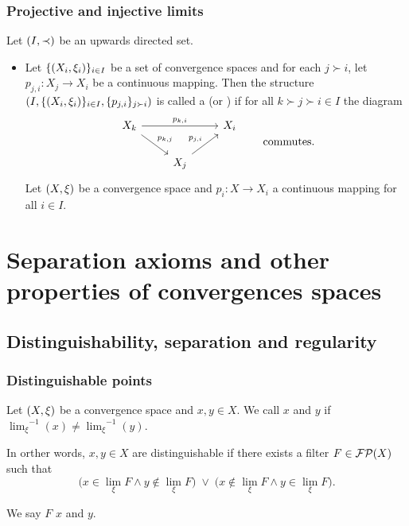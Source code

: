 \subsection{Projective and injective limits}
\begin{definition}
Let $\left( I, \prec \right)$ be an upwards directed set.
\begin{itemize}
\item Let $\{\left( X_i, \xi_i \right)\}_{i\in I}$ be a set of convergence spaces and for each $j \succ i$, let $p_{j,i}: X_j \to X_i$ be a continuous mapping. Then the structure $\left( I, \{\left( X_i, \xi_i \right)\}_{i\in I}, \{p_{j,i}\}_{j\succ i} \right)$ is called a  (or ) if for all $k \succ j \succ i \in I$ the diagram
\[ \begin{tikzcd}
X_k \ar[rr, "p_{k,i}"] \ar[rd, "p_{k,j}"] & & X_i \\
& X_j \ar[ur, "p_{j,i}"]
\end{tikzcd} \qquad \text{commutes.} \]
Let $\left( X, \xi \right)$ be a convergence space and $p_i: X\to X_i$ a continuous mapping for all $i\in I$. 
\end{itemize}
\end{definition}

\chapter{Separation axioms and other properties of convergences spaces}

\section{Distinguishability, separation and regularity}
\subsection{Distinguishable points}
\begin{definition}
Let $\left( X,\xi \right)$ be a convergence space and $x,y\in X$. We call $x$ and $y$  if ${\lim_\xi}^{-1}(x) \neq {\lim_\xi}^{-1}(y)$.
\end{definition}

In orther words, $x,y \in X$ are distinguishable if there exists a filter $F \in \operatorname{\mathcal{FP}}(X)$ such that
\[ \Big(x\in \lim_\xi F \land y\notin \lim_\xi F\Big)\;\lor\; \Big(x\notin \lim_\xi F \land y\in \lim_\xi F\Big). \]

We say $F$  $x$ and $y$.

